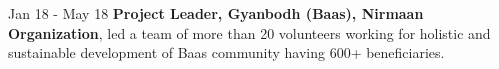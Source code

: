 \begin{cvskills}
    \cvskill
    {Jan 18 - May 18}
    {\textbf{Project Leader, Gyanbodh (Baas), Nirmaan Organization}, led a team of more than 20 volunteers working for holistic and sustainable development of Baas community having 600+ beneficiaries.}
\end{cvskills}